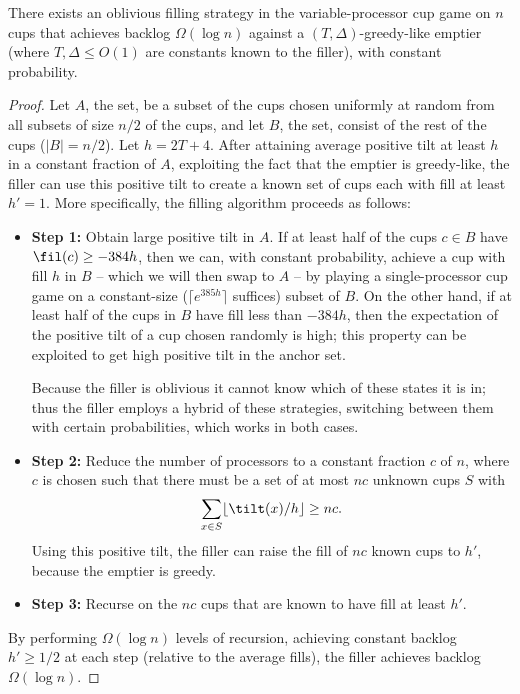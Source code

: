 \begin{proposition}
  \label{prop:obliviousBase}
  There exists an oblivious filling strategy in the variable-processor cup game
  on $n$ cups that achieves backlog $\Omega(\log n)$ against a $(T,
  \Delta)$-greedy-like emptier (where $T, \Delta \le O(1)$ are constants
  known to the filler), with constant probability.
\end{proposition}
\begin{proof}
  Let $A$, the  set, be a subset of the cups chosen uniformly at
  random from all subsets of size $n/2$ of the cups, and let $B$, the
   set, consist of the rest of the cups ($|B| = n/2$). Let $h
  = 2 T + 4$. After attaining average positive tilt at least $h$ in a constant
  fraction of $A$, exploiting the fact that the emptier is greedy-like, the
  filler can use this positive tilt to create a known set of cups each with
  fill at least $h' = 1$. More specifically, the filling algorithm proceeds as
  follows: 
  \begin{itemize}
    \item \textbf{Step 1:} 
      Obtain large positive tilt in $A$. If at least half of the cups $c\in B$
      have $\fil(c) \ge -384h$, then we can, with constant probability, achieve
      a cup with fill $h$ in $B$ -- which we will then swap to $A$ -- by
      playing a single-processor cup game on a constant-size ($\lceil e^{385h}
      \rceil$ suffices) subset of $B$. 
      On the other hand, if at least half of the cups in $B$ have fill less than
      $-384h$, then the expectation of the positive tilt of a cup chosen
      randomly is high; this property can be exploited to get high positive
      tilt in the anchor set.

      Because the filler is oblivious it cannot know which of these states it is in; 
      thus the filler employs a hybrid of these strategies, switching between
      them with certain probabilities, which works in both cases.
  \item \textbf{Step 2:} Reduce the number of processors to a constant fraction
    $c$ of $n$, where $c$ is chosen such that there must be a set of at most $nc$ unknown cups $S$ with 
    $$\sum_{x\in S} \lfloor \tilt(x) / h \rfloor \ge nc.$$
    Using this positive tilt, the filler can raise the fill of $nc$ known cups
    to $h'$, because the emptier is greedy.
  \item \textbf{Step 3:} Recurse on the $nc$ cups that are known to have fill
    at least $h'$.
\end{itemize}
By performing $\Omega(\log n)$ levels of recursion, achieving constant backlog
$h'\ge 1/2$ at each step (relative to the average fills), the filler achieves backlog
$\Omega(\log n)$.


\end{proof}
